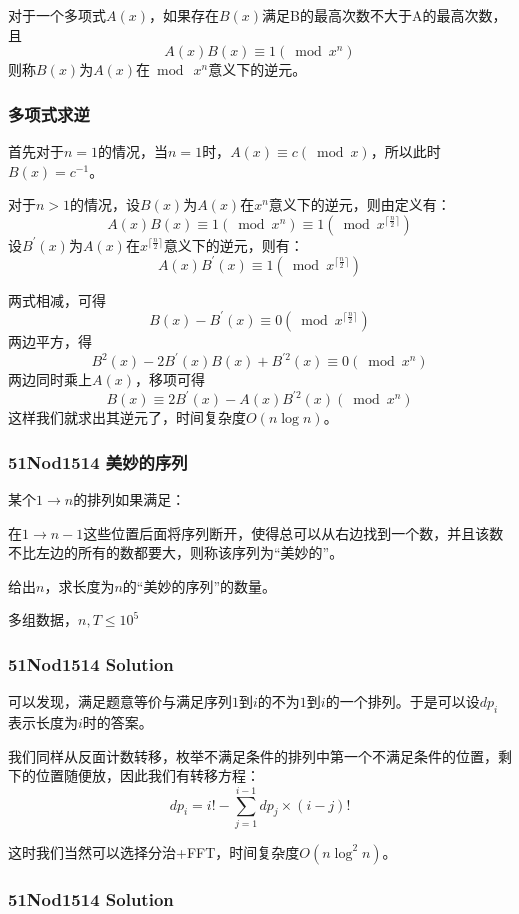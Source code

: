 \documentclass[10pt]{beamer}
\begin{document}
\begin{spacing}{1.2}
\begin{frame}
			对于一个多项式$A(x)$，如果存在$B(x)$满足B的最高次数不大于A的最高次数，且
			$$A(x)B(x) \equiv 1 (\bmod x^n)$$
			则称$B(x)$为$A(x)$在$\bmod \ x^n$意义下的逆元。

		\end{frame}
		\begin{frame}
			\frametitle{多项式求逆}

			首先对于$n = 1$的情况，当$n = 1$时，$A(x) \equiv c (\bmod x)$，所以此时$B(x)=c ^ {-1}$。 \pause

			对于$n > 1$的情况，设$B(x)$为$A(x)$在$x^n$意义下的逆元，则由定义有：
			$$A(x)B(x) \equiv 1 (\bmod x^n) \equiv 1 (\bmod x^{\lceil\frac{n}{2}\rceil})$$ \pause
			设$B^{\prime}(x)$为$A(x)$在$x^{\lceil\frac{n}{2}\rceil}$意义下的逆元，则有：
			$$A(x)B^{\prime}(x) \equiv 1 (\bmod x^{\lceil\frac{n}{2}\rceil})$$
		\end{frame}
		\begin{frame}

			两式相减，可得
			$$B(x)-B^{\prime}(x) \equiv 0 (\bmod x^{\lceil\frac{n}{2}\rceil})$$ \pause
			两边平方，得
			$$B^2(x) - 2B^{\prime}(x)B(x) + B^{\prime 2}(x) \equiv 0 (\bmod x^n)$$ \pause
			两边同时乘上$A(x)$，移项可得
			$$B(x) \equiv 2B^{\prime}(x) - A(x)B^{\prime 2}(x) (\bmod x^n)$$ \pause
			这样我们就求出其逆元了，时间复杂度$O(n \log n)$。
		\end{frame}
		\begin{frame}
			\frametitle{51Nod1514 美妙的序列}

			某个$1 \to n$的排列如果满足：

			在$1 \to n-1$这些位置后面将序列断开，使得总可以从右边找到一个数，并且该数不比左边的所有的数都要大，则称该序列为“美妙的”。 \pause

			给出$n$，求长度为$n$的“美妙的序列”的数量。 \pause

			多组数据，$n,T \le 10^5$

		\end{frame}
		\begin{frame}
			\frametitle{51Nod1514 Solution}

			可以发现，满足题意等价与满足序列$1$到$i$的不为$1$到$i$的一个排列。于是可以设$dp_i$表示长度为$i$时的答案。 \pause

			我们同样从反面计数转移，枚举不满足条件的排列中第一个不满足条件的位置，剩下的位置随便放，因此我们有转移方程：
			$$dp_i = i! - \sum_{j=1}^{i-1}dp_j \times (i-j)!$$ \pause

			这时我们当然可以选择分治+FFT，时间复杂度$O(n \log^2 n)$。
		\end{frame}
		\begin{frame}
			\frametitle{51Nod1514 Solution}


\end{frame}
\end{spacing}
\end{document}
